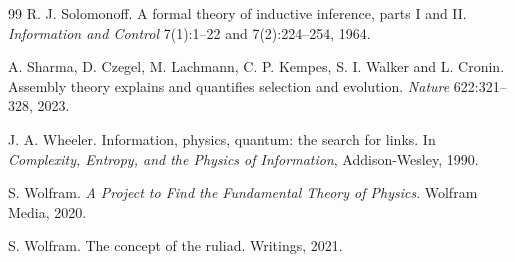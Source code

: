 \begin{thebibliography}{99}
 R. J. Solomonoff. A formal theory of inductive inference,
parts I and II. \emph{Information and Control} 7(1):1--22 and 7(2):224--254, 1964.

 A. Sharma, D. Czegel, M. Lachmann, C. P. Kempes, S. I. Walker and
L. Cronin. Assembly theory explains and quantifies selection and evolution.
\emph{Nature} 622:321--328, 2023.

 J. A. Wheeler. Information, physics, quantum: the search for
links. In \emph{Complexity, Entropy, and the Physics of Information}, Addison-Wesley,
1990.

 S. Wolfram. \emph{A Project to Find the Fundamental Theory of
Physics}. Wolfram Media, 2020.

 S. Wolfram. The concept of the ruliad. Writings, 2021.

\end{thebibliography}

